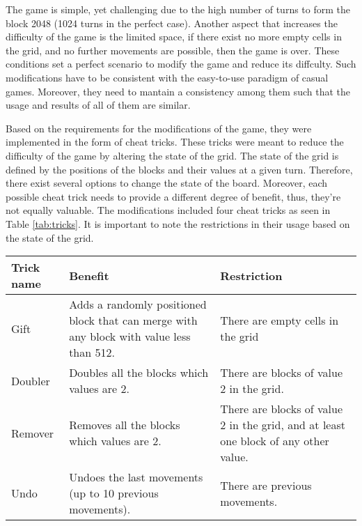 The game is simple, yet challenging due to the high number of turns to form the block 2048 (1024 turns in the perfect case). Another aspect that increases the difficulty of the game is the limited space, if there exist no more empty cells in the grid, and no further movements are possible, then the game is over. These conditions set a perfect scenario to modify the game and reduce its diffculty. Such modifications have to be consistent with the easy-to-use paradigm of casual games. Moreover, they need to mantain a consistency among them such that the usage and results of all of them are similar.

Based on the requirements for the modifications of the game, they were implemented in the form of cheat tricks. These tricks were meant to reduce the difficulty of the game by altering the state of the grid. The state of the grid is defined by the positions of the blocks and their values at a given turn. Therefore, there exist several options to change the state of the board. Moreover, each possible cheat trick needs to provide a different degree of benefit, thus, they're not equally valuable. The modifications included four cheat tricks as seen in Table \ref{tab:tricks}. It is important to note the restrictions in their usage based on the state of the grid.

\begin{table*}[!htb]
	\centering
	\begin{tabular}{|l|l|l|}
	\hline
	\textbf{Trick name} & \textbf{Benefit} & \textbf{Restriction}\\
	\hline
	Gift & Adds a randomly positioned block that can merge with any block with value less than 512. & There are empty cells in the grid\\
	\hline
	Doubler & Doubles all the blocks which values are 2. & There are blocks of value 2 in the grid.\\
	\hline
	Remover & Removes all the blocks which values are 2. & There are blocks of value 2 in the grid, and at least one block of any other value.\\
	\hline
	Undo & Undoes the last movements (up to 10 previous movements). & There are previous movements.\\
	\hline
	\end{tabular}
	\caption{Cheat tricks for the game, their benefits, and restrictions}
	\label{tab:tricks}
\end{table*}

